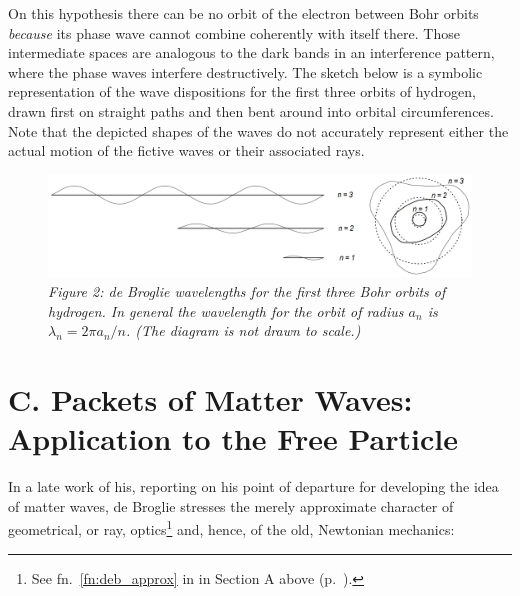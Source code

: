 On this hypothesis there can be no orbit of the electron between Bohr
orbits \emph{because} its phase wave cannot combine coherently with
itself there. Those intermediate spaces are analogous to the dark bands
in an interference pattern, where the phase waves interfere
destructively. The sketch below is a symbolic representation of the wave
dispositions for the first three orbits of hydrogen, drawn first on
straight paths and then bent around into orbital circumferences. Note
that the depicted shapes of the waves do not accurately represent either
the actual motion of the fictive waves or their associated rays.

\begin{figure}[h] %
\centering
    \includegraphics[width=\textwidth]{images/08_debroglie/standing-waves.png}
  \caption*{\emph{Figure 2: de Broglie wavelengths for the first three Bohr orbits of
     hydrogen. In general the wavelength for the orbit of radius $a_n$ is
     $\lambda_n = 2\pi a_n/n$. (The diagram is not drawn to scale.)}}
\end{figure}



\section*{C. Packets of Matter Waves: Application to the Free Particle }\label{SecC}

In a late work of his, reporting on his point of departure for
developing the idea of matter waves, de Broglie stresses the merely
approximate character of geometrical, or ray, optics\footnote{See fn.~\ref{fn:deb_approx} in
  in Section A above (p.~\pageref{fn:deb_approx}).} and, hence, of the old, Newtonian mechanics:

